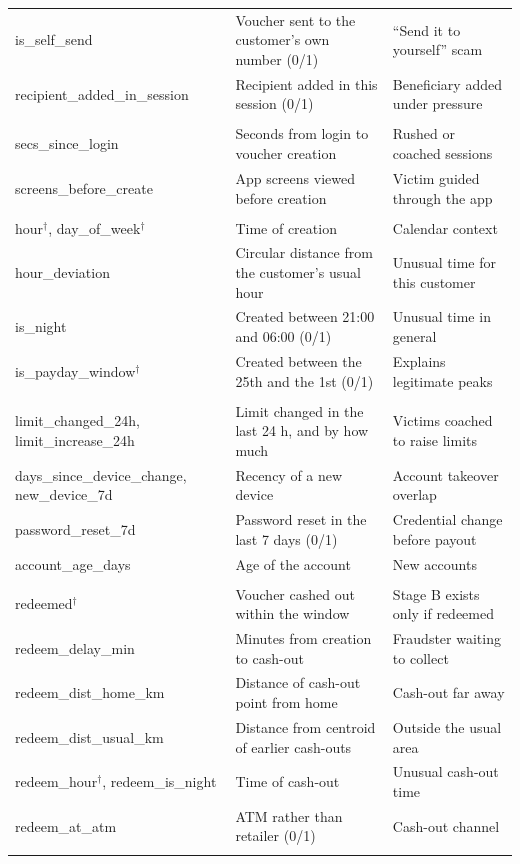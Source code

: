 \begin{xltabular}{\textwidth}{>{\ttfamily\raggedright\arraybackslash}p{0.31\textwidth} >{\raggedright\arraybackslash}X >{\raggedright\arraybackslash}X}
is\_self\_send & Voucher sent to the customer's own number (0/1) & ``Send it to yourself'' scam \\
recipient\_added\_in\_session & Recipient added in this session (0/1) & Beneficiary added under pressure \\
\\
secs\_since\_login & Seconds from login to voucher creation & Rushed or coached sessions \\
screens\_before\_create & App screens viewed before creation & Victim guided through the app \\
\\
hour$^\dagger$, day\_of\_week$^\dagger$ & Time of creation & Calendar context \\
hour\_deviation & Circular distance from the customer's usual hour & Unusual time for this customer \\
is\_night & Created between 21:00 and 06:00 (0/1) & Unusual time in general \\
is\_payday\_window$^\dagger$ & Created between the 25th and the 1st (0/1) & Explains legitimate peaks \\
\\
limit\_changed\_24h, limit\_increase\_24h & Limit changed in the last 24 h, and by how much & Victims coached to raise limits \\
days\_since\_device\_change, new\_device\_7d & Recency of a new device & Account takeover overlap \\
password\_reset\_7d & Password reset in the last 7 days (0/1) & Credential change before payout \\
account\_age\_days & Age of the account & New accounts \\
\midrule
{}\\
redeemed$^\dagger$ & Voucher cashed out within the window & Stage B exists only if redeemed \\
redeem\_delay\_min & Minutes from creation to cash-out & Fraudster waiting to collect \\
redeem\_dist\_home\_km & Distance of cash-out point from home & Cash-out far away \\
redeem\_dist\_usual\_km & Distance from centroid of earlier cash-outs & Outside the usual area \\
redeem\_hour$^\dagger$, redeem\_is\_night & Time of cash-out & Unusual cash-out time \\
redeem\_at\_atm & ATM rather than retailer (0/1) & Cash-out channel \\
\midrule
{}
\end{xltabular}
\endgroup
